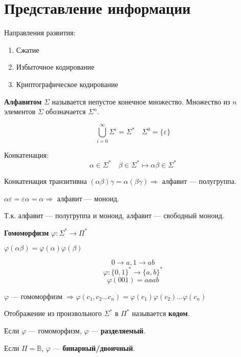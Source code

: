 

\cfoot{}



\section{Представление информации}

Направления развития:
\begin{enumerate}
    \item Сжатие
    \item Избыточное кодирование
    \item Криптографическое кодирование
\end{enumerate}

\begin{definition}
    \textbf{Алфавитом} $\Sigma$ называется непустое конечное множество. Множество из $n$ элементов $\Sigma$ обозначается $\Sigma^n$.
\end{definition}

$$\bigcup\limits_{i=0}^\infty \Sigma^i=\Sigma^* \quad \Sigma^0=\{\varepsilon\}$$

\begin{definition}
    Конкатенация:
    $$\alpha\in\Sigma^* \quad \beta\in\Sigma^* \mapsto \alpha\beta\in\Sigma^*$$
\end{definition}

Конкатенация транзитивна $(\alpha\beta)\gamma=\alpha(\beta\gamma) \Rightarrow$ алфавит --- полугруппа.

$\alpha\varepsilon=\varepsilon\alpha=\alpha \Rightarrow$ алфавит --- моноид.

Т.к. алфавит --- полугруппа и моноид, алфавит --- свободный моноид.

\begin{definition}
    \textbf{Гомоморфизм} $\varphi: \Sigma^*\to \Pi^*$
    
    $\varphi(\alpha\beta)=\varphi(\alpha)\varphi(\beta)$
\end{definition}

\begin{example}
    $$0\to a, 1\to ab$$
    $$\varphi: \{0,1\}^*\to\{a,b\}^*$$
    $$\varphi(001)=aaab$$
\end{example}

$\varphi$ --- гомоморфизм $\Rightarrow \varphi(c_1,c_2\ldots c_n)=\varphi(c_1)\varphi(c_2)\ldots\varphi(c_n)$

\begin{definition}
    Отображение из произвольного $\Sigma^*$ в $\Pi^*$ называется \textbf{кодом}.

    Если $\varphi$ --- гомоморфизм, $\varphi$ --- \textbf{разделяемый}.

    Если $\Pi=\mathbb{B}$, $\varphi$ --- \textbf{бинарный/двоичный}.
\end{definition}

